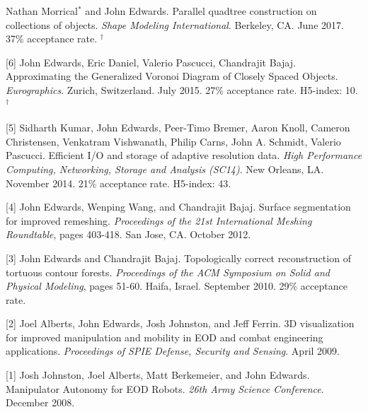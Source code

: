 \documentclass[margin,line]{res}
\newcommand{\pubunder}[1]{#1}
\newcommand{\cnum}[1]{[#1]}
\begin{document}
\begin{resume}
\cnum{7} Nathan Morrical$^*$ and \pubunder{John Edwards}. Parallel quadtree construction on collections of objects. \textit{Shape Modeling International}. Berkeley, CA. June 2017. 37\% acceptance rate.
$^\dagger$

\cnum{6} \pubunder{John Edwards}, Eric Daniel, Valerio Pascucci, Chandrajit Bajaj. Approximating the Generalized Voronoi Diagram of Closely Spaced Objects. \textit{Eurographics}. Zurich, Switzerland. July 2015. 27\% acceptance rate. H5-index: 10.
$^\dagger$

\cnum{5} Sidharth Kumar, \pubunder{John Edwards}, Peer-Timo Bremer, Aaron Knoll, Cameron Christensen, Venkatram Vishwanath, Philip Carns, John A. Schmidt, Valerio Pascucci. Efficient I/O and storage of adaptive resolution data. \textit{High Performance Computing, Networking, Storage and Analysis (SC14)}. New Orleans, LA. November 2014. 21\% acceptance rate. H5-index: 43.

\cnum{4} \pubunder{John Edwards}, Wenping Wang, and Chandrajit Bajaj. Surface segmentation for improved remeshing. \textit{Proceedings of the 21st International Meshing Roundtable}, pages 403-418. San Jose, CA. October 2012.

\cnum{3} \pubunder{John Edwards} and Chandrajit Bajaj. Topologically correct reconstruction of tortuous contour forests. \textit{Proceedings of the ACM Symposium on Solid and Physical Modeling}, pages 51-60. Haifa, Israel. September 2010. 29\% acceptance rate.

\cnum{2} Joel Alberts, \pubunder{John Edwards}, Josh Johnston, and Jeff Ferrin. 3D visualization for improved manipulation and mobility in EOD and combat engineering applications. \textit{Proceedings of SPIE Defense, Security and Sensing}. April 2009.

\cnum{1} Josh Johnston, Joel Alberts, Matt Berkemeier, and \pubunder{John Edwards}. Manipulator Autonomy for EOD Robots. \textit{26th Army Science Conference}. December 2008.


\end{resume}
\end{document}
